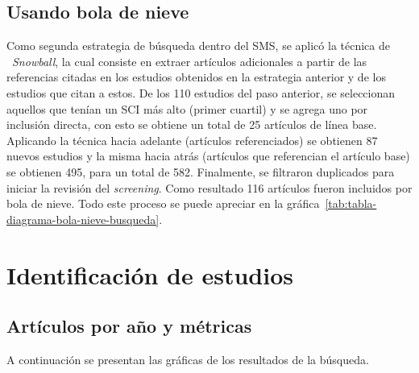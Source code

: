 \subsection{Usando bola de nieve}
\noindent
Como segunda estrategia de búsqueda dentro del SMS, se aplicó la técnica de ~\textit{Snowball}, la cual consiste en extraer artículos adicionales a partir de las referencias citadas en los estudios obtenidos en la estrategia anterior y de los estudios que citan a estos. De los 110 estudios del paso anterior, se seleccionan aquellos que tenían un SCI más alto (primer cuartil) y se agrega uno por inclusión directa, con esto se obtiene un total de 25 artículos de línea base. Aplicando la técnica hacia adelante (artículos referenciados) se obtienen 87 nuevos estudios y la misma hacia atrás (artículos que referencian el artículo base) se obtienen 495, para un total de 582. Finalmente, se filtraron duplicados para iniciar la revisión del \textit{screening}. Como resultado 116 artículos fueron incluidos por bola de nieve. Todo este proceso se puede apreciar en la gráfica~\ref{tab:tabla-diagrama-bola-nieve-busqueda}.


\section{Identificación de estudios}

\subsection{Artículos por año y métricas}
\noindent
A continuación se presentan las gráficas de los resultados de la búsqueda.


